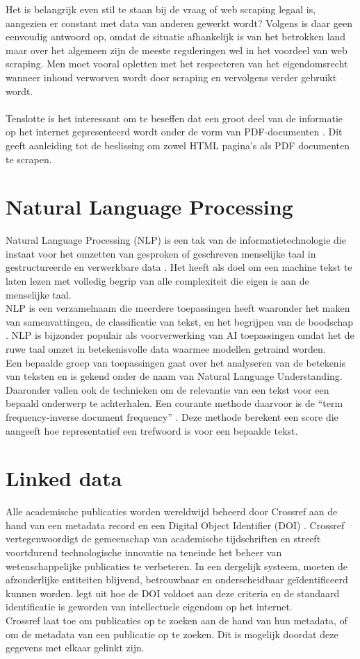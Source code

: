 Het is belangrijk even stil te staan bij de vraag of web scraping legaal is, aangezien er constant met data van anderen gewerkt wordt? Volgens \textcite{EPSI2015} is daar geen eenvoudig antwoord op, omdat de situatie afhankelijk is van het betrokken land maar over het algemeen zijn de meeste reguleringen wel in het voordeel van web scraping. Men moet vooral opletten met het respecteren van het eigendomsrecht wanneer inhoud verworven wordt door scraping en vervolgens verder gebruikt wordt.\\\\
Tenslotte is het interessant om te beseffen dat een groot deel van de informatie op het internet gepresenteerd wordt onder de vorm van PDF-documenten \autocite{Singrodia2019}. Dit geeft aanleiding tot de beslissing om zowel HTML pagina's als PDF documenten te scrapen.\\
\section{Natural Language Processing}
Natural Language Processing (NLP) is een tak van de informatietechnologie die instaat voor het omzetten van gesproken of geschreven menselijke taal in gestructureerde en verwerkbare data \autocite{Fanni2023}.
Het heeft als doel om een machine tekst te laten lezen met volledig begrip van alle complexiteit die eigen is aan de menselijke taal.\\
NLP is een verzamelnaam die meerdere toepassingen heeft waaronder het maken van samenvattingen, de classificatie van tekst, en het begrijpen van de boodschap \autocite{Khurana2022}. NLP is bijzonder populair als voorverwerking van AI toepassingen omdat het de ruwe taal omzet in betekenisvolle data waarmee modellen getraind worden.\\
Een bepaalde groep van toepassingen gaat over het analyseren van de betekenis van teksten en is gekend onder de naam van Natural Language Understanding. Daaronder vallen ook de technieken om de relevantie van een tekst voor een bepaald onderwerp te achterhalen. Een courante methode daarvoor is de ``term frequency-inverse document frequency'' \autocite{Havrlant2017}. Deze methode berekent een score die aangeeft hoe representatief een trefwoord is voor een bepaalde tekst. 
\section{Linked data}
Alle academische publicaties worden wereldwijd beheerd door Crossref aan de hand van een metadata record en een Digital Object Identifier (DOI) \autocite{Hendricks2020}. Crossref vertegenwoordigt de gemeenschap van academische tijdschriften en streeft voortdurend technologische innovatie na teneinde het beheer van wetenschappelijke publicaties te verbeteren.
In een dergelijk systeem, moeten de afzonderlijke entiteiten blijvend, betrouwbaar en onderscheidbaar geïdentificeerd kunnen worden. \textcite{Chandrakar2006} legt uit hoe de DOI voldoet aan deze criteria en de standaard identificatie is geworden van intellectuele eigendom op het internet.\\
Crossref laat toe om publicaties op te zoeken aan de hand van hun metadata, of om de metadata van een publicatie op te zoeken. Dit is mogelijk doordat deze gegevens met elkaar gelinkt zijn.
